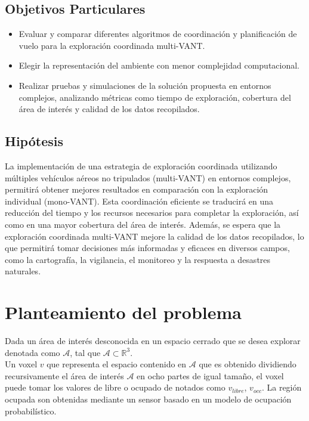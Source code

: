 \documentclass[sigconf]{acmart}
\begin{document}
\subsection*{Objetivos Particulares}

\begin{itemize}
\item Evaluar y comparar diferentes algoritmos de coordinación y planiﬁcación de vuelo para la exploración coordinada multi-VANT.
\item Elegir la representación del ambiente con menor complejidad computacional.
\item Realizar pruebas y simulaciones de la solución propuesta en entornos complejos, analizando métricas como tiempo de exploración, cobertura del área de interés y calidad de los datos recopilados.
\end{itemize}

\subsection*{Hipótesis}

La implementación de una estrategia de exploración coordinada utilizando múltiples vehículos aéreos no tripulados (multi-VANT) en entornos complejos, permitirá obtener mejores resultados en comparación con la exploración individual (mono-VANT). Esta coordinación eﬁciente se traducirá en una reducción del tiempo y los recursos necesarios para completar la exploración, así como en una mayor cobertura del área de interés. Además, se espera que la exploración coordinada multi-VANT mejore la calidad de los datos recopilados, lo que permitirá tomar decisiones más informadas y eﬁcaces en diversos campos, como la cartografía, la vigilancia, el monitoreo y la respuesta a desastres naturales.

\section{Planteamiento del problema}

Dada un área de interés desconocida en un espacio cerrado que se desea explorar denotada como $\mathcal{A}$, tal que $\mathcal{A} \subset \mathbb{R}^{3}$.\\

Un voxel $v$ que representa el espacio contenido en $\mathcal{A}$ que es obtenido dividiendo recursivamente el área de interés $\mathcal{A}$ en ocho partes de igual tamaño, el voxel puede tomar los valores de libre o ocupado de notados como $v_{libre}$, $v_{occ}$. La región ocupada son obtenidas mediante un sensor basado en un modelo de ocupación probabilístico.\\
\end{document}
